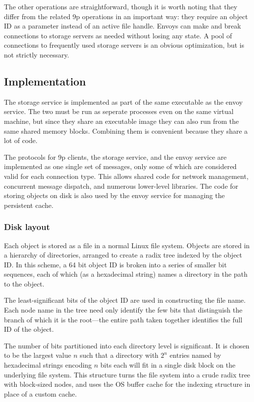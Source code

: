 The other operations are straightforward, though it is worth noting that they differ from the related 9p operations in an important way: they require an object ID as a parameter instead of an active file handle. Envoys can make and break connections to storage servers as needed without losing any state. A pool of connections to frequently used storage servers is an obvious optimization, but is not strictly necessary.

\subsection{Implementation}

The storage service is implemented as part of the same executable as the envoy service. The two must be run as seperate processes even on the same virtual machine, but since they share an executable image they can also run from the same shared memory blocks. Combining them is convenient because they share a lot of code.

The protocols for 9p clients, the storage service, and the envoy service are implemented as one single set of messages, only some of which are considered valid for each connection type. This allows shared code for network management, concurrent message dispatch, and numerous lower-level libraries. The code for storing objects on disk is also used by the envoy service for managing the persistent cache.

\subsubsection{Disk layout}

Each object is stored as a file in a normal Linux file system. Objects are stored in a hierarchy of directories, arranged to create a radix tree indexed by the object ID. In this scheme, a 64 bit object ID is broken into a series of smaller bit sequences, each of which (as a hexadecimal string) names a directory in the path to the object.

The least-significant bits of the object ID are used in constructing the file name. Each node name in the tree need only identify the few bits that distinguish the branch of which it is the root---the entire path taken together identifies the full ID of the object.

The number of bits partitioned into each directory level is significant. It is chosen to be the largest value $n$ such that a directory with $2^n$ entries named by hexadecimal strings encoding $n$ bits each will fit in a single disk block on the underlying file system. This structure turns the file system into a crude radix tree with block-sized nodes, and uses the OS buffer cache for the indexing structure in place of a custom cache.

